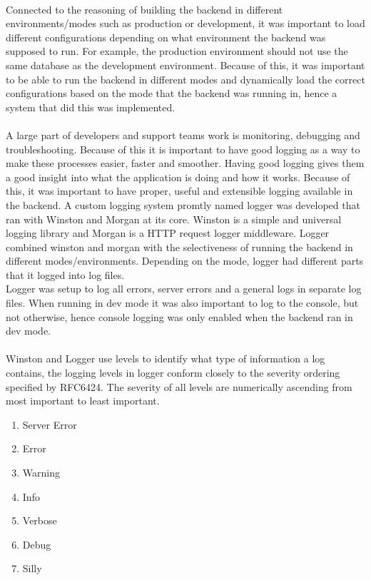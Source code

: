 \\
Connected to the reasoning of building the backend in different environments/modes such as production or development, it was important to load different configurations depending on what environment the backend was supposed to run. For example, the production environment should not use the same database as the development environment. Because of this, it was important to be able to run the backend in different modes and dynamically load the correct configurations based on the mode that the backend was running in, hence a system that did this was implemented.\\
\\
A large part of developers and support teams work is monitoring, debugging and troubleshooting. Because of this it is important to have good logging as a way to make these processes easier, faster and smoother. Having good logging gives them a good insight into what the application is doing and how it works. Because of this, it was important to have proper, useful and extensible logging available in the backend. A custom logging system promtly named logger was developed that ran with Winston and Morgan at its core. Winston is a simple and universal logging library and Morgan is a HTTP request logger middleware. Logger combined winston and morgan with the selectiveness of running the backend in different modes/environments. Depending on the mode, logger had different parts that it logged into log files.\\
Logger was setup to log all errors, server errors and a general logs in separate log files. When running in dev mode it was also important to log to the console, but not otherwise, hence console logging was only enabled when the backend ran in dev mode. \\
\\
Winston and Logger use levels to identify what type of information a log contains, the logging levels in logger conform closely to the severity ordering specified by RFC6424.
The severity of all levels are numerically ascending from most important to least important.
\begin{enumerate}
  \item Server Error
  \item Error
  \item Warning
  \item Info
  \item Verbose
  \item Debug
  \item Silly
\end{enumerate}

